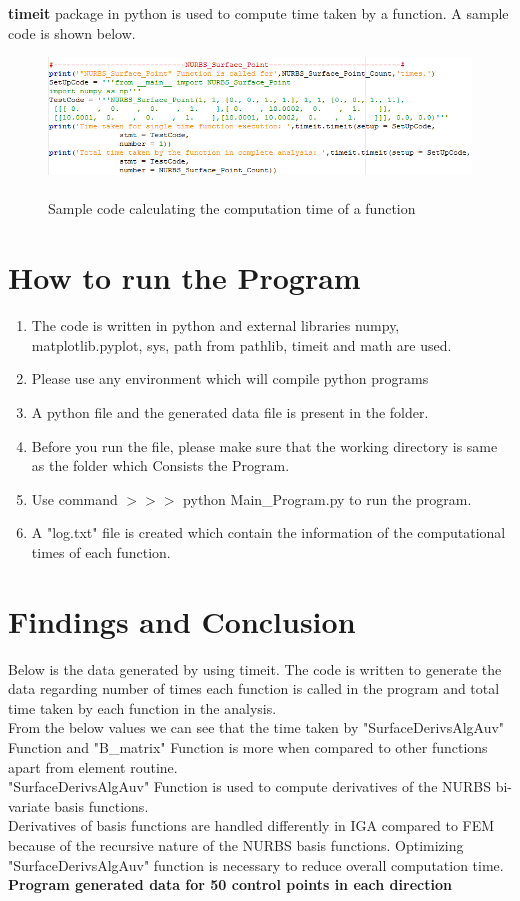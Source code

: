 \documentclass[11pt]{article}
\begin{document}
\textbf{timeit} package in python is used to compute time taken by a function. A sample code is shown below.
\begin{figure}[H]
	\begin{center}
		\includegraphics[scale=0.9]{TimeitCode.png} 
		\caption{\\Sample code calculating the computation time of a function}\label{TimeitCode}
	\end{center}	
\end{figure}
\newpage
\section{How to run the Program}
\begin{enumerate}[leftmargin=*]
	\item The code is written in python and external libraries numpy, matplotlib.pyplot, sys, path from pathlib, timeit and math are used.
	\item Please use any environment which will compile python programs
	\item A python file and the generated data file is present in the folder.
	\item Before you run the file, please make sure that the working directory is same as the folder  which
	Consists the Program.
	\item Use command  $>>>$ python Main\_Program.py to run the program.
	\item A "log.txt" file is created which contain the information of the computational times of each function. 
	 
	
\end{enumerate}
\newpage
\section{Findings and Conclusion} \label{Findings}

Below is the data generated by using timeit. The code is written to generate the data regarding number of times each function is called in the program and total time taken by each function in the analysis.\\
From the below values we can see that the time taken by "SurfaceDerivsAlgAuv" Function and "B\_matrix" Function is more when compared to other functions apart from element routine. \\
"SurfaceDerivsAlgAuv" Function is used to compute derivatives of the NURBS bi-variate basis functions.\\ 
Derivatives of basis functions are handled differently in IGA compared to FEM because of the recursive nature of the NURBS basis functions. Optimizing "SurfaceDerivsAlgAuv" function is necessary to reduce overall computation time.\\
\textbf{Program generated data for 50 control points in each direction}
\end{document}
